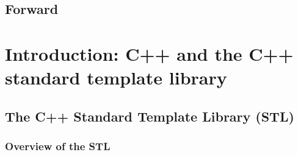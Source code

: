 \documentclass[11pt,fleqn]{book} %
\begin{document}
\tableofcontents %

\cleardoublepage %

\pagestyle{fancy} %

\chapter*{Forward}


\part{Introduction: C++ and the C++ standard template library}




\chapter{The C++ Standard Template Library (STL)}
\label{chapter:stl}

\section{Overview of the STL}

\end{document}

